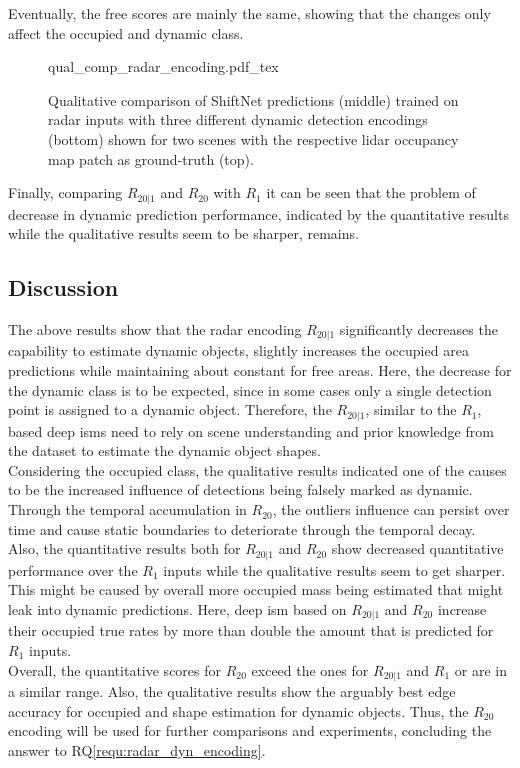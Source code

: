 Eventually, the free scores are mainly the same, showing that the changes only affect the occupied and dynamic class.
\begin{figure}[H]
	\begin{center}
		{qual_comp_radar_encoding.pdf_tex}
		\caption{\label{fig:qual_comp_radar_encoding}Qualitative comparison of ShiftNet predictions (middle) trained on radar inputs with three different dynamic detection encodings (bottom) shown for two scenes with the respective lidar occupancy map patch as ground-truth (top).}
	\end{center}
\end{figure}
Finally, comparing $R_{20|1}$ and $R_{20}$ with $R_1$ it can be seen that the problem of decrease in dynamic prediction performance, indicated by the quantitative results while the qualitative results seem to be sharper, remains.
%
\subsection{Discussion}
The above results show that the radar encoding $R_{20|1}$ significantly decreases the capability to estimate dynamic objects, slightly increases the occupied area predictions while maintaining about constant for free areas. Here, the decrease for the dynamic class is to be expected, since in some cases only a single detection point is assigned to a dynamic object. Therefore, the $R_{20|1}$, similar to the $R_1$, based deep \gls{ism}s need to rely on scene understanding and prior knowledge from the dataset to estimate the dynamic object shapes.\\
Considering the occupied class, the qualitative results indicated one of the causes to be the increased influence of detections being falsely marked as dynamic. Through the temporal accumulation in $R_{20}$, the outliers influence can persist over time and cause static boundaries to deteriorate through the temporal decay.\\
Also, the quantitative results both for $R_{20|1}$ and $R_{20}$ show decreased quantitative performance over the $R_1$ inputs while the qualitative results seem to get sharper. This might be caused by overall more occupied mass being estimated that might leak into dynamic predictions. Here, deep \gls{ism} based on $R_{20|1}$ and $R_{20}$ increase their occupied true rates by more than double the amount that is predicted for $R_1$ inputs.\\
Overall, the quantitative scores for $R_{20}$ exceed the ones for $R_{20|1}$ and $R_1$ or are in a similar range. Also, the qualitative results show the arguably best edge accuracy for occupied and shape estimation for dynamic objects. Thus, the $R_{20}$ encoding will be used for further comparisons and experiments, concluding the answer to RQ\ref{requ:radar_dyn_encoding}.
%
